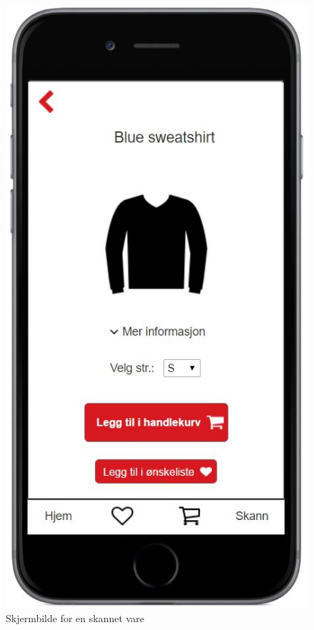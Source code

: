 \begin{figure}[H]
\includegraphics[scale=0.466]{images/axurebilder/genser.JPG}
\centering %
\caption{Skjermbilde for en skannet vare}
\label{fig:vare-skjerm}
\end{figure}

